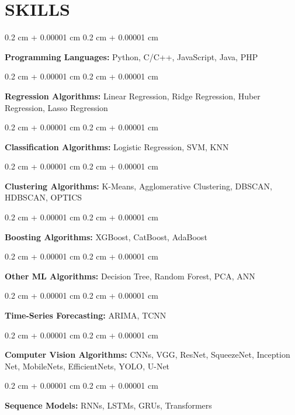 \documentclass[10pt, letterpaper]{article}
\newenvironment{onecolentry}{
    \begin{adjustwidth}{
        0.2 cm + 0.00001 cm
    }{
        0.2 cm + 0.00001 cm
    }
}{
    \end{adjustwidth}
} %
\begin{document}
    \section{SKILLS}
        \begin{onecolentry}
            \textbf{Programming Languages:} Python, C/C++, JavaScript, Java, PHP
        \end{onecolentry}
        \vspace{0.1 cm}
        \begin{onecolentry}
            \textbf{Regression Algorithms:} Linear Regression, Ridge Regression, Huber Regression, Lasso Regression
        \end{onecolentry}
        \vspace{0.1 cm}
        \begin{onecolentry}
            \textbf{Classification Algorithms:} Logistic Regression, SVM, KNN
        \end{onecolentry}
        \vspace{0.1 cm}
        \begin{onecolentry}
            \textbf{Clustering Algorithms:} K-Means, Agglomerative Clustering, DBSCAN, HDBSCAN, OPTICS
        \end{onecolentry}
        \vspace{0.1 cm}
        \begin{onecolentry}
            \textbf{Boosting Algorithms:} XGBoost, CatBoost, AdaBoost
        \end{onecolentry}
        \vspace{0.1 cm}
        \begin{onecolentry}
            \textbf{Other ML Algorithms:} Decision Tree, Random Forest, PCA, ANN
        \end{onecolentry}
        \vspace{0.1 cm}
        \begin{onecolentry}
            \textbf{Time-Series Forecasting:} ARIMA, TCNN
        \end{onecolentry}
        \vspace{0.1 cm}
        \begin{onecolentry}
            \textbf{Computer Vision Algorithms:} CNNs, VGG, ResNet, SqueezeNet, Inception Net, MobileNets, EfficientNets, YOLO, U-Net
        \end{onecolentry}
        \vspace{0.1 cm}
        \begin{onecolentry}
            \textbf{Sequence Models:} RNNs, LSTMs, GRUs, Transformers
        \end{onecolentry}
\end{document}
